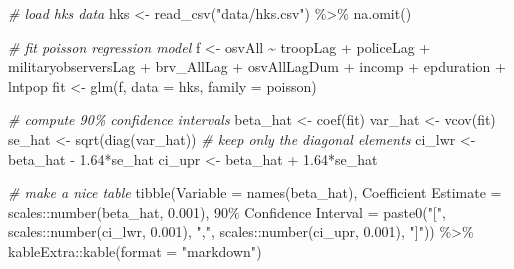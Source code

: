 \documentclass[
]{book}
\newenvironment{Shaded}{\begin{snugshade}}{\end{snugshade}}
\newcommand{\AttributeTok}[1]{\textcolor[rgb]{0.77,0.63,0.00}{#1}}
\newcommand{\CommentTok}[1]{\textcolor[rgb]{0.56,0.35,0.01}{\textit{#1}}}
\newcommand{\FloatTok}[1]{\textcolor[rgb]{0.00,0.00,0.81}{#1}}
\newcommand{\FunctionTok}[1]{\textcolor[rgb]{0.00,0.00,0.00}{#1}}
\newcommand{\NormalTok}[1]{#1}
\newcommand{\OtherTok}[1]{\textcolor[rgb]{0.56,0.35,0.01}{#1}}
\newcommand{\SpecialCharTok}[1]{\textcolor[rgb]{0.00,0.00,0.00}{#1}}
\newcommand{\StringTok}[1]{\textcolor[rgb]{0.31,0.60,0.02}{#1}}
\begin{document}
\begin{Shaded}
\begin{Highlighting}[]
\CommentTok{\# load hks data}
\NormalTok{hks }\OtherTok{\textless{}{-}} \FunctionTok{read\_csv}\NormalTok{(}\StringTok{"data/hks.csv"}\NormalTok{) }\SpecialCharTok{\%\textgreater{}\%}
  \FunctionTok{na.omit}\NormalTok{()}

\CommentTok{\# fit poisson regression model}
\NormalTok{f }\OtherTok{\textless{}{-}}\NormalTok{ osvAll }\SpecialCharTok{\textasciitilde{}}\NormalTok{ troopLag }\SpecialCharTok{+}\NormalTok{ policeLag }\SpecialCharTok{+}\NormalTok{ militaryobserversLag }\SpecialCharTok{+} 
\NormalTok{  brv\_AllLag }\SpecialCharTok{+}\NormalTok{ osvAllLagDum }\SpecialCharTok{+}\NormalTok{ incomp }\SpecialCharTok{+}\NormalTok{ epduration }\SpecialCharTok{+} 
\NormalTok{  lntpop}
\NormalTok{fit }\OtherTok{\textless{}{-}} \FunctionTok{glm}\NormalTok{(f, }\AttributeTok{data =}\NormalTok{ hks, }\AttributeTok{family =}\NormalTok{ poisson)}

\CommentTok{\# compute 90\% confidence intervals}
\NormalTok{beta\_hat }\OtherTok{\textless{}{-}} \FunctionTok{coef}\NormalTok{(fit)}
\NormalTok{var\_hat }\OtherTok{\textless{}{-}} \FunctionTok{vcov}\NormalTok{(fit)}
\NormalTok{se\_hat }\OtherTok{\textless{}{-}} \FunctionTok{sqrt}\NormalTok{(}\FunctionTok{diag}\NormalTok{(var\_hat))  }\CommentTok{\# keep only the diagonal elements}
\NormalTok{ci\_lwr }\OtherTok{\textless{}{-}}\NormalTok{ beta\_hat }\SpecialCharTok{{-}} \FloatTok{1.64}\SpecialCharTok{*}\NormalTok{se\_hat}
\NormalTok{ci\_upr }\OtherTok{\textless{}{-}}\NormalTok{ beta\_hat }\SpecialCharTok{+} \FloatTok{1.64}\SpecialCharTok{*}\NormalTok{se\_hat}

\CommentTok{\# make a nice table}
\FunctionTok{tibble}\NormalTok{(}\StringTok{\textasciigrave{}}\AttributeTok{Variable}\StringTok{\textasciigrave{}} \OtherTok{=} \FunctionTok{names}\NormalTok{(beta\_hat),}
       \StringTok{\textasciigrave{}}\AttributeTok{Coefficient Estimate}\StringTok{\textasciigrave{}} \OtherTok{=}\NormalTok{ scales}\SpecialCharTok{::}\FunctionTok{number}\NormalTok{(beta\_hat, }\FloatTok{0.001}\NormalTok{),}
       \StringTok{\textasciigrave{}}\AttributeTok{90\% Confidence Interval}\StringTok{\textasciigrave{}} \OtherTok{=} \FunctionTok{paste0}\NormalTok{(}\StringTok{"["}\NormalTok{, scales}\SpecialCharTok{::}\FunctionTok{number}\NormalTok{(ci\_lwr, }\FloatTok{0.001}\NormalTok{), }\StringTok{","}\NormalTok{, scales}\SpecialCharTok{::}\FunctionTok{number}\NormalTok{(ci\_upr, }\FloatTok{0.001}\NormalTok{), }\StringTok{"]"}\NormalTok{)) }\SpecialCharTok{\%\textgreater{}\%}
\NormalTok{  kableExtra}\SpecialCharTok{::}\FunctionTok{kable}\NormalTok{(}\AttributeTok{format =} \StringTok{"markdown"}\NormalTok{)}
\end{Highlighting}
\end{Shaded}
\end{document}
